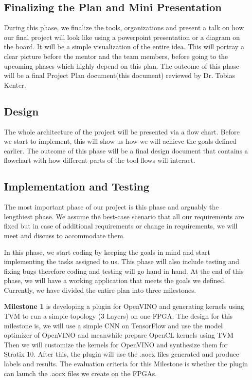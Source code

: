 \documentclass[titlepage]{report}
\begin{document}
\subsection{Finalizing the Plan and Mini Presentation}
During this phase, we finalize the tools, organizations and present a talk on how our final project will look like using a powerpoint presentation or a diagram on the board. It will be a simple visualization of the entire idea. This will portray a clear picture before the mentor and the team members, before going to the upcoming phases which highly depend on this plan. The outcome of this phase will be a final Project Plan document(this document) reviewed by Dr. Tobias Kenter. 

\subsection{Design}
The whole architecture of the project will be presented via a flow chart. Before we start to implement, this will show us how we will achieve the goals defined earlier. The outcome of this phase will be a final design document that contains a flowchart with how different parts of the tool-flows will interact.  

\subsection{Implementation and Testing}
The most important phase of our project is this phase and arguably the lengthiest phase. We assume the best-case scenario that all our requirements are fixed but in case of additional requirements or change in requirements, we will meet and discuss to accommodate them. 

In this phase, we start coding by keeping the goals in mind and start implementing the tasks assigned to us. This phase will also include testing and fixing bugs therefore coding and testing will go hand in hand. At the end of this phase, we will have a working application that meets the goals we defined. Currently, we have divided the entire plan into three milestones. 

\textbf{Milestone 1} is developing a plugin for OpenVINO and generating kernels using TVM to run a simple topology (3 Layers) on one FPGA. The design for this milestone is, we will use a simple CNN on TensorFlow and use the model optimizer of OpenVINO and meanwhile prepare OpenCL kernels using TVM Then we will customize the kernels for OpenVINO and synthesize them for Stratix 10. After this, the plugin will use the .aocx files generated and produce labels and results. The evaluation criteria for this Milestone is whether the plugin can launch the .aocx files we create on the FPGAs. 
\end{document}
